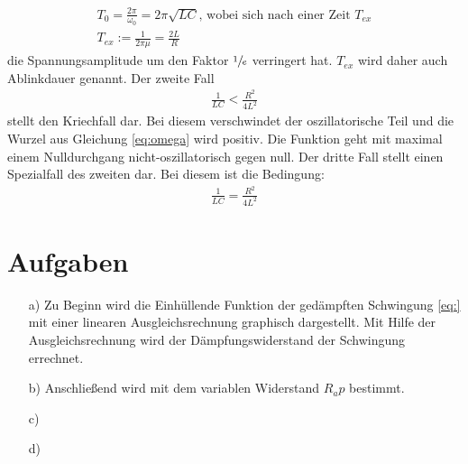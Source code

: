 \begin{align}
    T_0 =\frac{2 \pi}{\omega _0}=2 \pi \sqrt{LC} \text{, wobei sich nach einer Zeit $T_{ex}$}\\
    T_{ex}:= \frac{1}{2 \pi \mu}=\frac{2L}{R} \label{eq:Abkling}
\end{align}
\justify
die Spannungsamplitude um den Faktor $\sfrac{1}{e}$ verringert hat.
$T_{ex}$ wird daher auch Ablinkdauer genannt.
\justify
Der zweite Fall
\begin{align}
    \frac{1}{LC} <\frac{R^2}{4L^2} \label{eq:Fall2}
\end{align}
stellt den Kriechfall dar. Bei diesem verschwindet der oszillatorische Teil und
die Wurzel aus Gleichung \eqref{eq:omega} wird positiv.
Die Funktion geht mit maximal einem Nulldurchgang nicht-oszillatorisch gegen null.
\justify
Der dritte Fall stellt einen Spezialfall des zweiten dar.
Bei diesem ist die Bedingung:
\begin{align}
    \frac{1}{LC} = \frac{R^2}{4L^2} \label{eq:Fall3}
\end{align}





\section{Aufgaben}\justifying

 \begin{enumerate}

    \item[a)] \justifying Zu Beginn wird die Einhüllende Funktion der gedämpften
    Schwingung \eqref{eq:} mit einer linearen Ausgleichsrechnung graphisch dargestellt. 
    Mit Hilfe der Ausgleichsrechnung wird der Dämpfungswiderstand der Schwingung errechnet.

    \item[b)] \justifying Anschließend wird mit dem variablen Widerstand $R_ap$ bestimmt.
  
    \item[c)] \justifying 
  
    \item[d)] \justifying 
    
  \end{enumerate}


